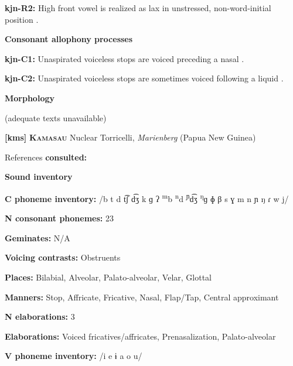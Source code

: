 \textbf{kjn-R2:} High front vowel is realized as lax in unstressed, non-word-initial position \citep[41]{Sommer1969}.



\textbf{Consonant allophony processes}



\textbf{kjn-C1:} Unaspirated voiceless stops are voiced preceding a nasal \citep[39]{Sommer1969}.



\textbf{kjn-C2:} Unaspirated voiceless stops are sometimes voiced following a liquid \citep[39]{Sommer1969}.



\textbf{Morphology}



(adequate texts unavailable)



\textbf{[kms]}   \textbf{\textsc{Kamasau}}  Nuclear Torricelli, \textit{Marienberg} (Papua New Guinea)



References \textbf{consulted:} \citet{SandersSanders1980}



\textbf{Sound inventory}



\textbf{C phoneme inventory:} /b t d t͡ʃ d͡ʒ k ɡ ʔ \textsuperscript{m}b \textsuperscript{n}d \textsuperscript{ɲ}d͡ʒ \textsuperscript{ŋ}ɡ ɸ β s ɣ m n ɲ ŋ ɾ w j/



\textbf{N consonant phonemes:} 23



\textbf{Geminates:} N/A



\textbf{Voicing contrasts:} Obstruents



\textbf{Places:} Bilabial, Alveolar, Palato-alveolar, Velar, Glottal



\textbf{Manners:} Stop, Affricate, Fricative, Nasal, Flap/Tap, Central approximant



\textbf{N elaborations:} 3



\textbf{Elaborations:} Voiced fricatives/affricates, Prenasalization, Palato-alveolar



\textbf{V phoneme inventory:} /i e ɨ a o u/



